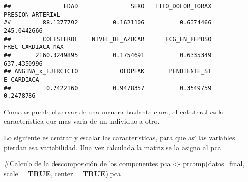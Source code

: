 \documentclass[
]{article}
\newenvironment{Shaded}{\begin{snugshade}}{\end{snugshade}}
\newcommand{\AttributeTok}[1]{\textcolor[rgb]{0.80,0.80,0.80}{#1}}
\newcommand{\CommentTok}[1]{\textcolor[rgb]{0.50,0.62,0.50}{#1}}
\newcommand{\ConstantTok}[1]{\textcolor[rgb]{0.86,0.64,0.64}{\textbf{#1}}}
\newcommand{\FunctionTok}[1]{\textcolor[rgb]{0.94,0.94,0.56}{#1}}
\newcommand{\NormalTok}[1]{\textcolor[rgb]{0.80,0.80,0.80}{#1}}
\newcommand{\OtherTok}[1]{\textcolor[rgb]{0.94,0.94,0.56}{#1}}
\begin{document}
\begin{verbatim}
##               EDAD               SEXO   TIPO_DOLOR_TORAX   PRESION_ARTERIAL 
##         88.1377792          0.1621106          0.6374466        245.0442666 
##         COLESTEROL    NIVEL_DE_AZUCAR      ECG_EN_REPOSO  FREC_CARDIACA_MAX 
##       2160.3249895          0.1754691          0.6335349        637.4350996 
## ANGINA_x_EJERCICIO            OLDPEAK       PENDIENTE_ST         E_CARDIACA 
##          0.2422160          0.9478357          0.3549759          0.2478786
\end{verbatim}

Como se puede observar de una manera bastante clara, el colesterol es la
característica que mas varia de un individuo a otro.

Lo siguiente es centrar y escalar las características, para que así las
variables pierdan esa variabilidad. Una vez calculada la matriz se la
asigno al pca

\begin{Shaded}
\begin{Highlighting}[]
\CommentTok{\#Calculo de la descomposición de los componentes}
\NormalTok{pca }\OtherTok{\textless{}{-}} \FunctionTok{prcomp}\NormalTok{(datos\_final, }\AttributeTok{scale =} \ConstantTok{TRUE}\NormalTok{, }\AttributeTok{center =} \ConstantTok{TRUE}\NormalTok{)}
\NormalTok{pca}
\end{Highlighting}
\end{Shaded}
\end{document}
